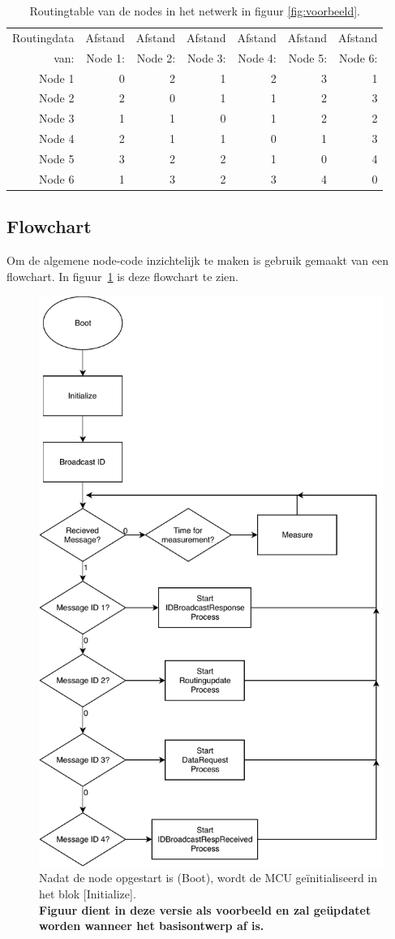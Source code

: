 \documentclass[a4paper, 11pt]{article}
\begin{document}
\begin{table}
\centering
\begin{tabular}{|r||r|r|r|r|r|r|}
\hline
Routingdata  & Afstand  & Afstand & Afstand & Afstand & Afstand & Afstand\\
van: & Node 1: & Node 2: & Node 3: & Node 4: & Node 5: & Node 6: \\
\hline
Node 1 & 0 & 2 & 1 & 2 & 3 & 1 \\
\hline
Node 2 & 2 & 0 & 1 & 1 & 2 & 3 \\
\hline
Node 3 & 1 & 1 & 0 & 1 & 2 & 2 \\
\hline
Node 4 & 2 & 1 & 1 & 0 & 1 & 3 \\
\hline
Node 5 & 3 & 2 & 2 & 1 & 0 & 4 \\
\hline
Node 6 & 1 & 3 & 2 & 3 & 4 & 0 \\
\hline
\end{tabular}
\caption{Routingtable van de nodes in het netwerk in figuur \ref{fig:voorbeeld}.}
\label{table:routingtable}
\end{table}
\subsection{Flowchart}
Om de algemene node-code inzichtelijk te maken is gebruik gemaakt van een flowchart. In figuur~\ref{fig:flowchart} is deze flowchart te zien.

\begin{figure}[!h]
	\centering
	\includegraphics[width=.5\textwidth, keepaspectratio]{media/Pflow.pdf}
    \caption{Nadat de node opgestart is (Boot), wordt de MCU geïnitialiseerd in het blok [Initialize].\\
     \textbf{Figuur dient in deze versie als voorbeeld en zal geüpdatet worden wanneer het basisontwerp af is.}}
    \label{fig:flowchart}
\end{figure}
\end{document}
